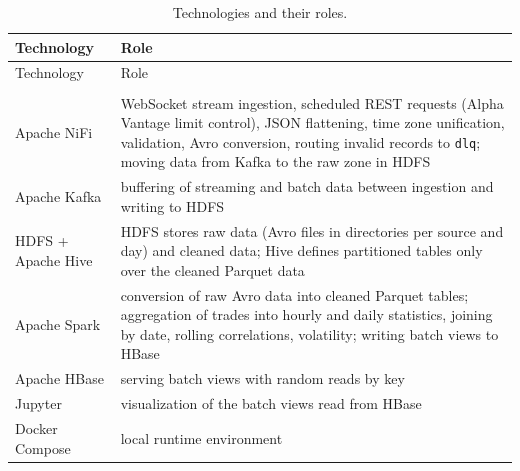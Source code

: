 \documentclass[
]{article}
\begin{document}
\begin{longtable}[]{@{}
  >{\raggedright\arraybackslash}p{}
  >{\raggedright\arraybackslash}p{}@{}}
\toprule\noalign{}
\begin{minipage}[b]{\linewidth}\raggedright
Technology
\end{minipage} & \begin{minipage}[b]{\linewidth}\raggedright
Role
\end{minipage} \\
\midrule\noalign{}
\endfirsthead
\toprule\noalign{}
\begin{minipage}[b]{\linewidth}\raggedright
Technology
\end{minipage} & \begin{minipage}[b]{\linewidth}\raggedright
Role
\end{minipage} \\
\midrule\noalign{}
\endhead
\bottomrule\noalign{}
\caption{Technologies and their roles.}\label{tbl-technologies}\tabularnewline
\endlastfoot
Apache NiFi & WebSocket stream ingestion, scheduled REST requests (Alpha Vantage limit control), JSON flattening, time zone unification, validation, Avro conversion, routing invalid records to \texttt{dlq}; moving data from Kafka to the raw zone in HDFS \\
\midrule\noalign{}
Apache Kafka & buffering of streaming and batch data between ingestion and writing to HDFS \\
\midrule\noalign{}
HDFS + Apache Hive & HDFS stores raw data (Avro files in directories per source and day) and cleaned data; Hive defines partitioned tables only over the cleaned Parquet data \\
\midrule\noalign{}
Apache Spark & conversion of raw Avro data into cleaned Parquet tables; aggregation of trades into hourly and daily statistics, joining by date, rolling correlations, volatility; writing batch views to HBase \\
\midrule\noalign{}
Apache HBase & serving batch views with random reads by key \\
\midrule\noalign{}
Jupyter & visualization of the batch views read from HBase \\
\midrule\noalign{}
Docker Compose & local runtime environment \\
\end{longtable}
\end{document}
